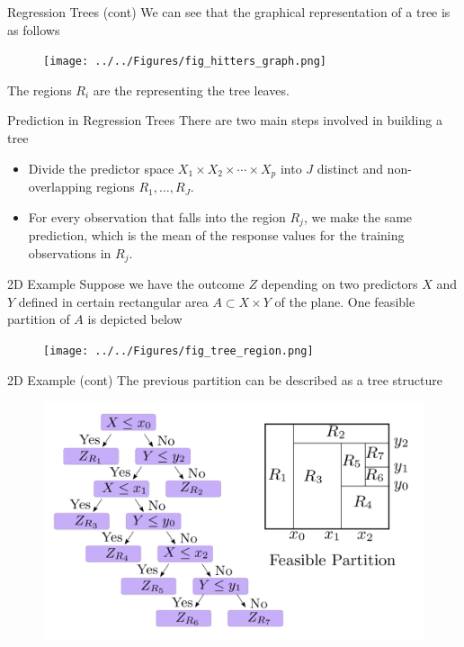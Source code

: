 \documentclass{beamer}
\begin{document}
\begin{frame}{Regression Trees (cont)}
	We can see that the graphical representation of a tree is as follows
	
	\begin{figure}[h]
		\centering
		\texttt{[image: ../../Figures/fig\_hitters\_graph.png]}
	\end{figure}
The regions $R_i$ are the representing the tree leaves. 	
	
\end{frame}

\begin{frame}{Prediction in Regression Trees}
	There are two main steps involved in building a tree
	
	\begin{itemize}
		\item Divide the predictor space $X_1 \times X_2 \times \cdots \times X_p$ into $J$ distinct and non-overlapping regions $R_1,\ldots, R_J$.
		\item For every observation that falls into the region $R_j$, we make the same prediction, which is the mean of the response values for the training observations in $R_j$.
	\end{itemize}
\end{frame}

\begin{frame}{2D Example}
	Suppose we have the outcome $Z$ depending on two predictors $X$ and $Y$ defined in certain rectangular area $A\subset X \times Y$ of the plane. One feasible partition of $A$ is depicted below
		\begin{figure}[h]
		\centering
		\texttt{[image: ../../Figures/fig\_tree\_region.png]}
	\end{figure}
	
\end{frame}

\begin{frame}{2D Example (cont)}
The previous partition can be described as a tree structure
\begin{figure}[h]
	\centering
	\includegraphics{../../Figures/fig_tree_combined.png}
\end{figure}
\end{frame}
\end{document}
